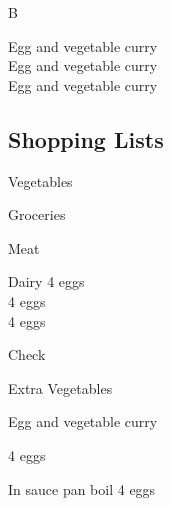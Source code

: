 		\begin{menu}{B}

    Egg and vegetable curry\\
    Egg and vegetable curry\\
    Egg and vegetable curry\\
    
    \subsection*{Shopping Lists}
      \begin{shoppinglist}{Vegetables}
      \end{shoppinglist}%
      \begin{shoppinglist}{Groceries}
      \end{shoppinglist}%
      \par\vfil %
      \begin{shoppinglist}{Meat}
      \end{shoppinglist}%
      \begin{shoppinglist}{Dairy}
      4  eggs \\ 
      4  eggs \\ 
      4  eggs \\ 
      \end{shoppinglist}%
      \par\vfil %
      \vfil\clearpage %
      \begin{shoppinglist}{Check}
      \end{shoppinglist}%
      \begin{shoppinglist}{Extra Vegetables}
      \end{shoppinglist}%
      \par\vfil %
    \vfil\clearpage
  
    \begin{recipe}{2}{Egg and vegetable curry}%
    
		\begin{ingredients}
		4  eggs  \\
	
		\end{ingredients}
	
    \begin{instructions}
    \item 
        In sauce pan boil
        4   eggs
    \end{instructions}
    \end{recipe}%
  

\end{menu}
